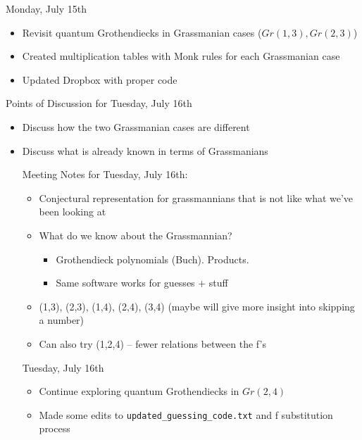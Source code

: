 Monday, July 15th
\begin{itemize}
    \item Revisit quantum Grothendiecks in Grassmanian cases ($Gr(1, 3), Gr(2, 3)$)
    \item Created multiplication tables with Monk rules for each Grassmanian case
    \item Updated Dropbox with proper code
\end{itemize}

Points of Discussion for Tuesday, July 16th
\begin{itemize}
    \item Discuss how the two Grassmanian cases are different
    \item Discuss what is already known in terms of Grassmanians

Meeting Notes for Tuesday, July 16th:
\begin{itemize}
    \item Conjectural representation for grassmannians that is not like what we've been looking at
    \item What do we know about the Grassmannian?
    \begin{itemize}
        \item Grothendieck polynomials (Buch). Products. 
        \item Same software works for guesses + stuff
    \end{itemize}
    \item (1,3), (2,3), (1,4), (2,4), (3,4) (maybe will give more insight into skipping a number)
    \item Can also try (1,2,4) -- fewer relations between the f's
\end{itemize}

Tuesday, July 16th
\begin{itemize}
    \item Continue exploring quantum Grothendiecks in $Gr(2, 4)$
    \item Made some edits to \texttt{updated\_guessing\_code.txt} and f substitution process
\end{itemize}
\end{itemize}